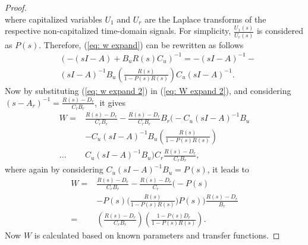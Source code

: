 \begin{proof}
\begin{equation}
\end{equation}
where capitalized variables $U_1$ and $U_r$ are the Laplace transforms of the respective non-capitalized time-domain signals. For simplicity, $\frac{U_1(s)}{U_r(s)}$ is considered as $P(s)$. Therefore, (\ref{eq: w expand}) can be rewritten as follows
\begin{equation}
\begin{split}
&\left(-(sI - A) + B_u R(s) C_u\right)^{-1}=-(sI - A)^{-1}-\\
&(sI - A)^{-1} B_u \left(\frac{R(s)}{1 - P(s)R(s)}\right)C_u (sI - A)^{-1}.
\label{eq: w expand 2}
\end{split}
\end{equation}
Now by substituting (\ref{eq: w expand 2}) in (\ref{eq: W expand 2}), and considering $(s - A_r)^{-1} = \frac{R(s) - D_r}{C_r B_r}$, it gives
\begin{equation}
\begin{split}
W =& \frac{R(s) - D_r}{C_r B_r} - \frac{R(s) - D_r}{C_r B_r} B_r  \Bigg(-C_u(sI - A)^{-1}B_u\\ &- C_u(sI - A)^{-1} B_u \left(\frac{R(s)}{1 - P(s) R(s)}\right)\\...&C_u(sI - A)^{-1}B_u\Bigg)C_r \frac{R(s) - D_r}{C_r B_r},
\end{split}
\end{equation}
where again by considering $C_u (sI - A)^{-1} B_u=P(s)$, it leads to
\begin{equation}
\begin{split}
W =& \frac{R(s) - D_r}{C_r B_r} - \frac{R(s) - D_r}{C_r} \Bigg(-P(s)\\ &-P(s) \Big(\frac{R(s)}{1 - P(s) R(s)}\Big) P(s)\Bigg) \frac{R(s) - D_r}{B_r} \\
=& \left(\frac{R(s) - D_r}{C_r B_r}\right) \left(\frac{1 - P(s) D_r}{1 - P(s) R(s)}\right).
\end{split}
\label{eq: W main}
\end{equation}
Now $W$ is calculated based on known parameters and transfer functions.


\end{proof}
